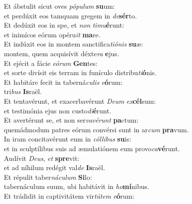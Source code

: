 \oddverse Et ábstulit sicut oves \textit{pó}\textit{pu}\textit{lum} \textbf{su}um:~\*\\
\oddverse et perdúxit eos tamquam gregem in \textit{de}\textbf{sér}to.\\
\evenverse Et dedúxit eos in spe, et \textit{non} \textit{ti}\textit{mu}\textbf{é}runt:~\*\\
\evenverse et inimícos eórum opéru\textit{it} \textbf{ma}re.\\
\oddverse Et indúxit eos in montem sanctifica\textit{ti}\textit{ó}\textit{nis} \textbf{su}æ:~\*\\
\oddverse montem, quem acquisívit déxte\textit{ra} \textbf{e}jus.\\
\evenverse Et ejécit a fácie \textit{e}\textit{ó}\textit{rum} \textbf{Gen}tes:~\*\\
\evenverse et sorte divísit eis terram in funículo distribu\textit{ti}\textbf{ó}nis.\\
\oddverse Et habitáre fecit in taberná\textit{cu}\textit{lis} \textit{e}\textbf{ó}rum:~\*\\
\oddverse tri\textit{bus} \textbf{Is}raël.\\
\evenverse Et tentavérunt, et exacerbavérunt \textit{De}\textit{um} \textit{ex}\textbf{cél}sum:~\*\\
\evenverse et testimónia ejus non custo\textit{di}\textbf{é}runt.\\
\oddverse Et avertérunt se, et non ser\textit{va}\textit{vé}\textit{runt} \textbf{pa}ctum:~\*\\
\oddverse quemádmodum patres eórum convérsi sunt in ar\textit{cum} \textbf{pra}vum.\\
\evenverse In iram concitavérunt eum in \textit{cól}\textit{li}\textit{bus} \textbf{su}is:~\*\\
\evenverse et in sculptílibus suis ad æmulatiónem eum provo\textit{ca}\textbf{vé}runt.\\
\oddverse Audívit \textit{De}\textit{us}, \textit{et} \textbf{spre}vit:~\*\\
\oddverse et ad níhilum redégit val\textit{de} \textbf{Is}raël.\\
\evenverse Et répulit taber\textit{ná}\textit{cu}\textit{lum} \textbf{Si}lo:~\*\\
\evenverse tabernáculum suum, ubi habitávit in \textit{ho}\textbf{mí}nibus.\\
\oddverse Et trádidit in captivitátem vir\textit{tú}\textit{tem} \textit{e}\textbf{ó}rum:~\*\\
